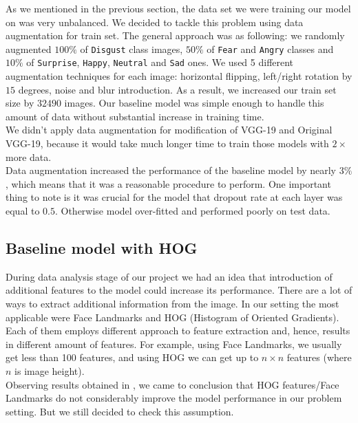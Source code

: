 As we mentioned in the previous section, the data set we were training our model on was very unbalanced. We decided to tackle this problem using data augmentation for train set. The general approach was as following: we randomly augmented $100\%$ of \texttt{Disgust} class images, $50\%$ of \texttt{Fear} and \texttt{Angry} classes and $10\%$ of \texttt{Surprise}, \texttt{Happy}, \texttt{Neutral} and \texttt{Sad} ones. We used 5 different augmentation techniques for each image: horizontal flipping, left/right rotation by $15$ degrees, noise and blur introduction. As a result, we increased our train set size by $32490$ images. Our baseline model was simple enough to handle this amount of data without substantial increase in training time.\\

We didn't apply data augmentation for modification of VGG-19 and Original VGG-19, because it would take much longer time to train those models with $2\times$ more data.\\ 

Data augmentation increased the performance of the baseline model by nearly $3\%$, which means that it was a reasonable procedure to perform. One important thing to note is it was crucial for the model that dropout rate at each layer was equal to $0.5$. Otherwise model over-fitted and performed poorly on test data.\\

\subsection{Baseline model with HOG}

During data analysis stage of our project we had an idea that introduction of additional features to the model could increase its performance. There are a lot of ways to extract additional information from the image. In our setting the most applicable were Face Landmarks and HOG (Histogram of Oriented Gradients). Each of them employs different approach to feature extraction and, hence, results in different amount of features. For example, using Face Landmarks, we usually get less than 100 features, and using HOG we can get up to $n\times n$ features (where $n$ is image height).\\

Observing results obtained in \cite{githubHOG}, we came to conclusion that HOG features/Face Landmarks do not considerably improve the model performance in our problem setting. But we still decided to check this assumption.\\

